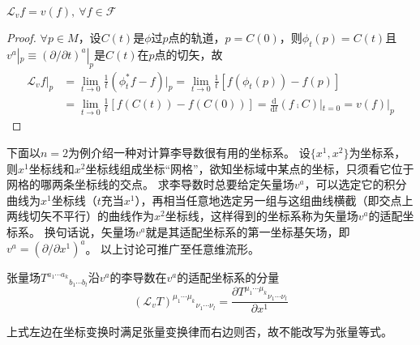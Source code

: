 \begin{theorem}
$\mathscr{L}_vf = v(f), ~ \forall f \in \mathscr{F}$
\end{theorem}

\begin{proof}
$\forall p \in M$，设$C(t)$是$\phi$过$p$点的轨道，$p = C(0)$，则$\phi_t(p) = C(t)$且$v^a|_p \equiv (\partial / \partial t)^a|_p$是$C(t)$在$p$点的切矢，故
$$\begin{aligned}
\mathscr{L}_vf|_p & = \lim_{t \to 0}\frac{1}{t}(\phi_t^*f - f)|_p = \lim_{t \to 0}\frac{1}{t}[f(\phi_t(p)) - f(p)] \\
& = \lim_{t \to 0}\frac{1}{t}[f(C(t)) - f(C(0))] = \frac{\mathrm{d}}{\mathrm{d}t}(f \comp C)|_{t = 0} = v(f)|_p
\end{aligned}$$
\end{proof}

下面以$n = 2$为例介绍一种对计算李导数很有用的坐标系。
设$\{x^1, x^2\}$为坐标系，则$x^1$坐标线和$x^2$坐标线组成坐标``网格''，欲知坐标域中某点的坐标，只须看它位于网格的哪两条坐标线的交点。
求李导数时总要给定矢量场$v^a$，可以选定它的积分曲线为$x^1$坐标线（$t$充当$x^1$），再相当任意地选定另一组与这组曲线横截（即交点上两线切矢不平行）的曲线作为$x^2$坐标线，这样得到的坐标系称为矢量场$v^a$的适配坐标系。
换句话说，矢量场$v^a$就是其适配坐标系的第一坐标基矢场，即$v^a = (\partial / \partial x^1)^a$。
以上讨论可推广至任意维流形。

\begin{theorem}
张量场$T^{a_1 \cdots a_k}{}_{b_1 \cdots b_l}$沿$v^a$的李导数在$v^a$的适配坐标系的分量
$$(\mathscr{L}_vT)^{\mu_1 \cdots \mu_k}{}_{\nu_1 \cdots \nu_l} = \frac{\partial T^{\mu_1 \cdots \mu_k}{}_{\nu_1 \cdots \nu_l}}{\partial x^1}$$
\end{theorem}

\begin{note}
上式左边在坐标变换时满足张量变换律而右边则否，故不能改写为张量等式。
\end{note}

